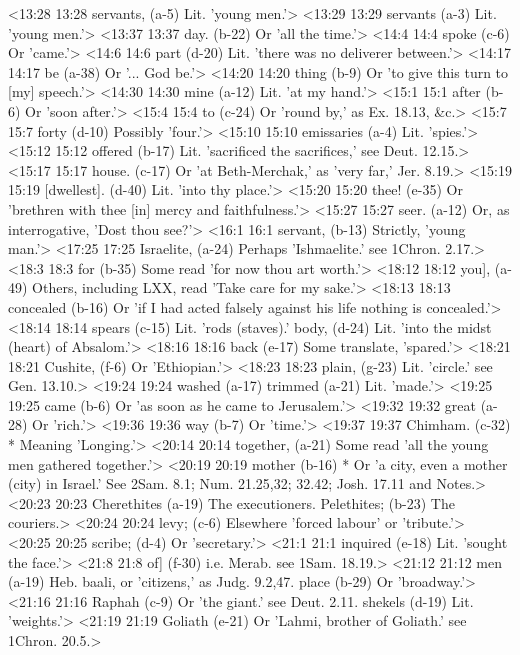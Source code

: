 <13:28 13:28  servants, (a-5) Lit. 'young men.'>
<13:29 13:29  servants (a-3)  Lit. 'young men.'>
<13:37 13:37  day. (b-22)  Or 'all the time.'>
<14:4 14:4  spoke (c-6)  Or 'came.'>
<14:6 14:6  part (d-20)  Lit. 'there was no deliverer between.'>
<14:17 14:17  be (a-38)  Or '... God be.'>
<14:20 14:20  thing (b-9)  Or 'to give this turn to [my] speech.'>
<14:30 14:30  mine (a-12)  Lit. 'at my hand.'>
<15:1 15:1  after (b-6)  Or 'soon after.'>
<15:4 15:4  to (c-24)  Or 'round by,' as Ex. 18.13, &c.>
<15:7 15:7  forty (d-10)  Possibly 'four.'>
<15:10 15:10  emissaries (a-4)  Lit. 'spies.'>
<15:12 15:12  offered (b-17)  Lit. 'sacrificed the sacrifices,' see Deut. 12.15.>
<15:17 15:17  house. (c-17)  Or 'at Beth-Merchak,' as 'very far,' Jer. 8.19.>
<15:19 15:19  [dwellest]. (d-40)  Lit. 'into thy place.'>
<15:20 15:20  thee! (e-35)  Or 'brethren with thee [in] mercy and faithfulness.'>
<15:27 15:27  seer. (a-12)  Or, as interrogative, 'Dost thou see?'>
<16:1 16:1  servant, (b-13)  Strictly, 'young man.'>
<17:25 17:25  Israelite, (a-24)  Perhaps 'Ishmaelite.' see 1Chron. 2.17.>
<18:3 18:3  for (b-35)  Some read 'for now thou art worth.'>
<18:12 18:12  you], (a-49)  Others, including LXX, read 'Take care for my sake.'>
<18:13 18:13  concealed (b-16)  Or 'if I had acted falsely against his life nothing is  concealed.'>
<18:14 18:14  spears (c-15)  Lit. 'rods (staves).'
  body, (d-24)  Lit. 'into the midst (heart) of Absalom.'>
<18:16 18:16  back (e-17)  Some translate, 'spared.'>
<18:21 18:21  Cushite, (f-6)  Or 'Ethiopian.'>
<18:23 18:23  plain, (g-23)  Lit. 'circle.' see Gen. 13.10.>
<19:24 19:24  washed (a-17)  trimmed (a-21)
  Lit. 'made.'>
<19:25 19:25  came (b-6)  Or 'as soon as he came to Jerusalem.'>
<19:32 19:32  great (a-28)  Or 'rich.'>
<19:36 19:36  way (b-7)  Or 'time.'>
<19:37 19:37  Chimham. (c-32)  * Meaning 'Longing.'>
<20:14 20:14  together, (a-21)  Some read 'all the young men gathered together.'>
<20:19 20:19  mother (b-16)  * Or 'a city, even a mother (city) in Israel.' See 2Sam. 8.1;  Num. 21.25,32; 32.42; Josh. 17.11 and Notes.>
<20:23 20:23  Cherethites (a-19)  The executioners.
  Pelethites; (b-23)  The couriers.>
<20:24 20:24  levy; (c-6)  Elsewhere 'forced labour' or 'tribute.'>
<20:25 20:25  scribe; (d-4)  Or 'secretary.'>
<21:1 21:1  inquired (e-18)  Lit. 'sought the face.'>
<21:8 21:8  of] (f-30)  i.e. Merab. see 1Sam. 18.19.>
<21:12 21:12  men (a-19)  Heb. baali, or 'citizens,' as Judg. 9.2,47.
  place (b-29)  Or 'broadway.'>
<21:16 21:16  Raphah (c-9)  Or 'the giant.' see Deut. 2.11.
  shekels (d-19)  Lit. 'weights.'>
<21:19 21:19  Goliath (e-21)  Or 'Lahmi, brother of Goliath.' see 1Chron. 20.5.>
